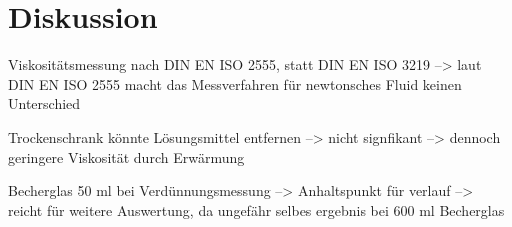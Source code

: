 \section{Diskussion}
\label{sec:diskussion}


Viskositätsmessung nach DIN EN ISO 2555, statt DIN EN ISO 3219 --> laut DIN EN ISO 2555 macht das Messverfahren für newtonsches Fluid keinen Unterschied

Trockenschrank könnte Lösungsmittel entfernen --> nicht signfikant --> dennoch geringere Viskosität durch Erwärmung

Becherglas 50 ml bei Verdünnungsmessung --> Anhaltspunkt für verlauf --> reicht für weitere Auswertung, da ungefähr selbes ergebnis bei 600 ml Becherglas